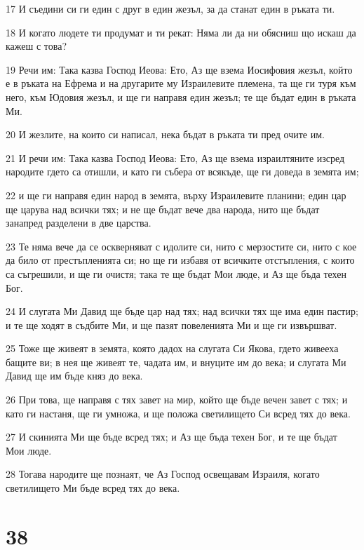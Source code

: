 \par 17 И съедини си ги един с друг в един жезъл, за да станат един в ръката ти.
\par 18 И когато людете ти продумат и ти рекат: Няма ли да ни обясниш що искаш да кажеш с това?
\par 19 Речи им: Така казва Господ Иеова: Ето, Аз ще взема Иосифовия жезъл, който е в ръката на Ефрема и на другарите му Израилевите племена, та ще ги туря към него, към Юдовия жезъл, и ще ги направя един жезъл; те ще бъдат един в ръката Ми.
\par 20 И жезлите, на които си написал, нека бъдат в ръката ти пред очите им.
\par 21 И речи им: Така казва Господ Иеова: Ето, Аз ще взема израилтяните изсред народите гдето са отишли, и като ги събера от всякъде, ще ги доведа в земята им;
\par 22 и ще ги направя един народ в земята, върху Израилевите планини; един цар ще царува над всички тях; и не ще бъдат вече два народа, нито ще бъдат занапред разделени в две царства.
\par 23 Те няма вече да се оскверняват с идолите си, нито с мерзостите си, нито с кое да било от престъпленията си; но ще ги избавя от всичките отстъпления, с които са съгрешили, и ще ги очистя; така те ще бъдат Мои люде, и Аз ще бъда техен Бог.
\par 24 И слугата Ми Давид ще бъде цар над тях; над всички тях ще има един пастир; и те ще ходят в съдбите Ми, и ще пазят повеленията Ми и ще ги извършват.
\par 25 Тоже ще живеят в земята, която дадох на слугата Си Якова, гдето живееха бащите ви; в нея ще живеят те, чадата им, и внуците им до века; и слугата Ми Давид ще им бъде княз до века.
\par 26 При това, ще направя с тях завет на мир, който ще бъде вечен завет с тях; и като ги настаня, ще ги умножа, и ще положа светилището Си всред тях до века.
\par 27 И скинията Ми ще бъде всред тях; и Аз ще бъда техен Бог, и те ще бъдат Мои люде.
\par 28 Тогава народите ще познаят, че Аз Господ освещавам Израиля, когато светилището Ми бъде всред тях до века.

\chapter{38}

